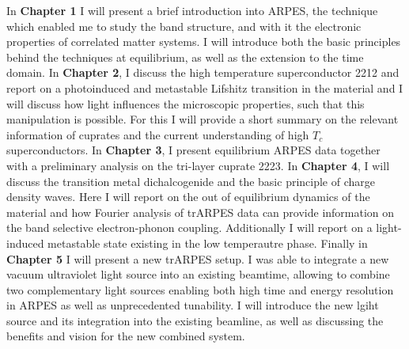 In \textbf{Chapter 1} I will present a brief introduction into ARPES, the technique which enabled me to study the band structure, and with it the electronic properties of correlated matter systems.
I will introduce both the basic principles behind the techniques at equilibrium, as well as the extension to the time domain.
In \textbf{Chapter 2}, I discuss the high temperature superconductor 2212 and report on a photoinduced and metastable Lifshitz transition in the material and I will discuss how light influences the microscopic properties, such that this manipulation is possible.
For this I will provide a short summary on the relevant information of cuprates and the current understanding of high $T_c$ superconductors.
In \textbf{Chapter 3}, I present equilibrium ARPES data together with a preliminary analysis on the tri-layer cuprate 2223.
In \textbf{Chapter 4}, I will discuss the transition metal dichalcogenide  and the basic principle of charge density waves.
Here I will report on the out of equilibrium dynamics of the material and how Fourier analysis of trARPES data can provide information on the band selective electron-phonon coupling. Additionally I will report on a light-induced metastable state existing in the low temperautre phase.
Finally in \textbf{Chapter 5} I will present a new trARPES setup.
I was able to integrate a new vacuum ultraviolet light source into an existing beamtime, allowing to combine two complementary light sources enabling both high time and energy resolution in ARPES as well as unprecedented tunability.
I will introduce the new lgiht source and its integration into the existing beamline, as well as discussing the benefits and vision for the new combined system.
